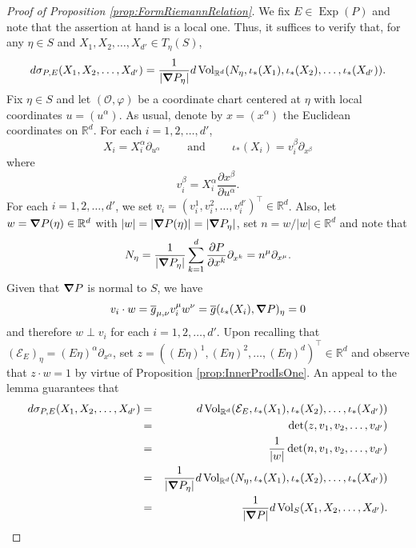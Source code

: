 \documentclass[11pt]{article}
\theoremstyle{remark}
\newcommand\Exp{\operatorname{Exp}}
\renewcommand\det{\operatorname{det}}
\newcommand{\Vol}{\operatorname{Vol}}
\begin{document}
\begin{proof}[Proof of Proposition \ref{prop:FormRiemannRelation}]
We fix $E\in\Exp(P)$ and note that the assertion at hand is a local one. Thus, it suffices to verify that, for any $\eta\in S$ and $X_1,X_2,\dots,X_{d'}\in T_\eta(S)$, 
\begin{equation*}
    d\sigma_{P,E}(X_1,X_2,\dots,X_{d'})=\frac{1}{|\grad P_{\eta}|}d\Vol_{\mathbb{R}^d}(N_\eta,\iota_*(X_1),\iota_*(X_2),\dots,\iota_*(X_{d'})).
\end{equation*}
Fix $\eta\in S$ and let $(\mathcal{O},\varphi)$ be a coordinate chart centered at $\eta$ with local coordinates $u=(u^{\alpha})$. As usual, denote by $x=(x^{\alpha})$ the Euclidean coordinates on $\mathbb{R}^d$.  For each $i=1,2,\dots,{d'}$, \begin{equation*}
X_i=X_i^\alpha \partial_{u^{\alpha}}\hspace{1cm}\mbox{and}\hspace{1cm}\iota_*(X_i)=v_i^\beta\partial_{x^{\beta}}
\end{equation*}
where
\begin{equation*}
v_i^\beta =X_i^\alpha\frac{\partial x^\beta}{\partial u^\alpha}.
\end{equation*}
For each $i=1,2,\dots,d'$, we set $v_i=(v_i^1,v_i^2,\dots,v_i^{d'})^\top\in\mathbb{R}^d$. Also, let $w=\grad P(\eta)\in\mathbb{R}^d$ with $|w|=|\grad P(\eta)|=|\grad P_\eta|$, set $n=w/|w|\in\mathbb{R}^d$ and note that
\begin{equation*}
    N_\eta=\frac{1}{|\grad P_\eta|}\sum_{k=1}^d\frac{\partial P}{\partial x^{k}}\partial_{x^k}=n^{\mu}\partial_{x^\mu}.
\end{equation*}Given that $\grad P$ is normal to $S$, we have
\begin{equation*}
    v_i\cdot w=\overline{g}_{\mu,\nu}v_i^\mu w^\nu= \overline{g}(\iota_*(X_i),\grad P)_\eta=0
\end{equation*}
and therefore $w\perp v_i$ for each $i=1,2,\dots,{d'}$. Upon recalling that $(\mathcal{E}_E)_\eta=(E\eta)^\alpha\partial_{x^{\alpha}}$, set $z=((E\eta)^1,(E\eta)^2,\dots,(E\eta)^d)^\top\in\mathbb{R}^d$ and observe that $z\cdot w=1$ by virtue of Proposition \ref{prop:InnerProdIsOne}. An appeal to the lemma guarantees that
\begin{eqnarray*}
d\sigma_{P,E}(X_1,X_2,\dots,X_{d'})&=&d\Vol_{\mathbb{R}^d}(\mathcal{E}_E,\iota_*(X_1),\iota_*(X_2),\dots,\iota_*(X_{d'}))\\
&=&\det(z,v_1,v_2,\dots,v_{d'})\\
&=&\frac{1}{|w|}\det(n,v_1,v_2,\dots,v_{d'})\\
&=&\frac{1}{|\grad P_\eta|}d\Vol_{\mathbb{R}^d}(N_\eta,\iota_*(X_1),\iota_*(X_2),\dots,\iota_*(X_{d'}))\\
&=&\frac{1}{|\grad P|}d\Vol_S(X_1,X_2,\dots,X_{d'}).
\end{eqnarray*}
\end{proof}
\end{document}
